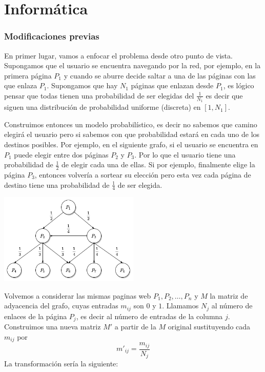\documentclass[size=a4, parskip=half, titlepage=false, toc=flat, toc=bib, 12pt]{scrartcl}
\theoremstyle{theorem-style}
\theoremstyle{definition-style}
\theoremstyle{remark-style}
\theoremstyle{example-style}
\theoremstyle{definition-style}
\theoremstyle{remark-style}
\begin{document}
\newpage

\part{Informática}

\section{Modificaciones previas}

En primer lugar, vamos a enfocar el problema desde otro punto de vista. Supongamos que el usuario se encuentra navegando por la red, por ejemplo, en la primera página $P_1$ y cuando se aburre decide saltar a una de las páginas con las que enlaza $P_1$. Supongamos que hay $N_1$ páginas que enlazan desde $P_1$, es lógico pensar que todas tienen una probabilidad de ser elegidas del $\frac{1}{N_1}$ es decir que siguen una distribución de probabilidad uniforme (discreta) en $[1, N_1]$.

Construimos entonces un modelo probabilístico, es decir no sabemos que camino elegirá el usuario pero si sabemos con que probabilidad estará en cada uno de los destinos posibles. Por ejemplo, en el siguiente grafo, si el usuario se encuentra en $P_1$ puede elegir entre dos páginas $P_2$ y $P_3$. Por lo que el usuario tiene una probabilidad de $\frac{1}{2}$ de elegir cada una de ellas. Si por ejemplo, finalmente elige la página $P_3$, entonces volvería a sortear su elección pero esta vez cada página de destino tiene una probabilidad de $\frac{1}{4}$ de ser elegida.

\begin{center}
\includegraphics[width=0.5\textwidth]{./img/grafoprob}
\end{center}

Volvemos a considerar las mismas paginas web $P_1, P_2, \dots, P_n$ y $M$ la matriz de adyacencia del grafo, cuyas entradas $m_{ij}$ son $0$ y $1$. Llamamos $N_j$ al número de enlaces de la página $P_j$,  es decir al número de entradas de la columna $j$. Construimos una nueva matriz $M'$ a partir de la $M$ original sustituyendo cada $m_{ij}$ por
$$m'_{ij} = \frac{m_{ij}}{N_j} $$
La transformación sería la siguiente:
\end{document}

